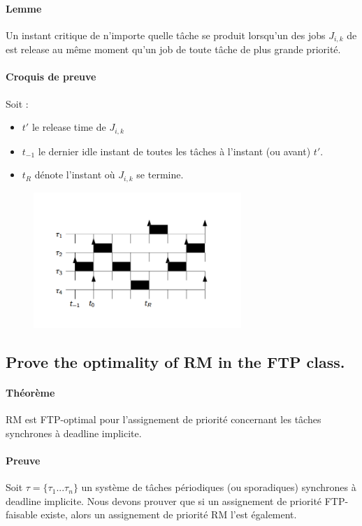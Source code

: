\paragraph{Lemme} Un instant critique de n'importe quelle tâche \ti se produit lorsqu'un des jobs $J_{i, k}$ de \ti est release au même moment qu'un job de toute tâche de plus grande priorité.

\paragraph{Croquis de preuve} Soit :
\begin{itemize}
\item $t'$ le release time de $J_{i, k}$
\item $t_{-1}$ le dernier idle instant de toutes les tâches à l'instant (ou avant) $t'$.
\item $t_{R}$ dénote l'instant où $J_{i, k}$ se termine.
\end{itemize}

\begin{figure}[H]
\centering
\includegraphics[width=0.7\textwidth]{img_2_3__0}
\end{figure}

\newpage
\subsection{Prove the optimality of RM in the FTP class.}
\paragraph{Théorème} RM est FTP-optimal pour l'assignement de priorité concernant les tâches synchrones à deadline implicite.

\paragraph{Preuve}
Soit $\tau = \{\tau_{1}...\tau_{n}\}$ un système de tâches périodiques (ou sporadiques) synchrones à deadline implicite. Nous devons prouver que si un assignement de priorité FTP-faisable existe, alors un assignement de priorité RM l'est également.


